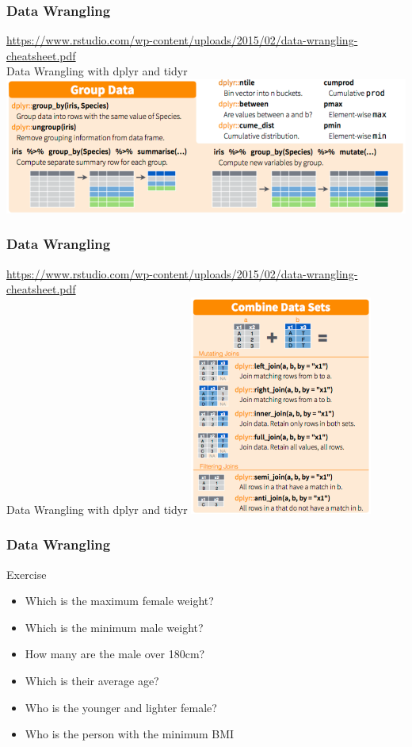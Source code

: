 \documentclass{beamer}
\begin{document}
\begin{frame}[fragile]
	\frametitle{Data Wrangling}
	\centering \tiny \url{https://www.rstudio.com/wp-content/uploads/2015/02/data-wrangling-cheatsheet.pdf}\\
	\centering \Large Data Wrangling with dplyr and tidyr
	\vspace{15pt}
	\includegraphics{figures/dp7.png}

\end{frame}

\begin{frame}[fragile]
	\frametitle{Data Wrangling}
	\centering \tiny \url{https://www.rstudio.com/wp-content/uploads/2015/02/data-wrangling-cheatsheet.pdf}\\
	\centering \Large Data Wrangling with dplyr and tidyr
	\vspace{10pt}
	\includegraphics[width=6cm]{figures/dp8.png}

\end{frame}

\begin{frame}[fragile]
	\frametitle{Data Wrangling}
	\centering \LARGE Exercise
	\begin{itemize}
		\small
		\item Which is the maximum female weight? 
		\item Which is the minimum male weight? 
		\item How many are the male over 180cm? 
		\item Which is their average age?
		\item Who is the younger and lighter female? 
		\item Who is the person with the minimum BMI
	\end{itemize}
	\small
\end{frame}
\end{document}
